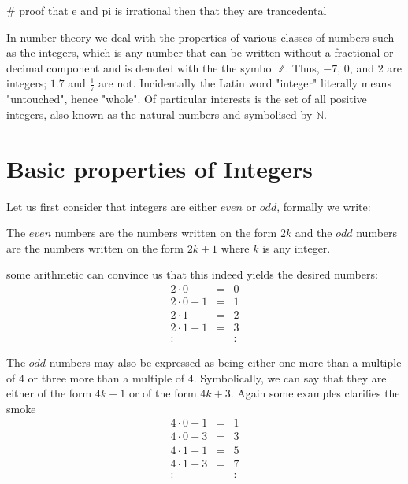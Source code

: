 # proof that e and pi is irrational then that they are trancedental


In number theory we deal with the properties of various classes of numbers such
as the integers, which is any number that can be written without a fractional
or decimal component and is denoted with the the symbol $\mathbb{Z}$. Thus,
$-7$, $0$, and $2$ are integers; $1.7$ and $\frac{1}{7}$ are not. Incidentally
the Latin word "integer" literally means "untouched", hence "whole". Of
particular interests is the set of all positive integers, also known as the
natural numbers and symbolised by $\mathbb{N}$.

\section{Basic properties of Integers}
Let us first consider that integers are either $even$ or $odd$, formally we
write:
\begin{definition}\label{num_def}
The $even$ numbers are the numbers written on the form $2k$ and the $odd$ numbers are the numbers written on the form $2k+1$ where $k$ is any integer.
\end{definition}
some arithmetic can convince us that this indeed yields the desired numbers:
\[
\begin{array}{lcl}
2 \cdot 0     & = & 0 \\
2 \cdot 0 + 1 & = & 1 \\
2 \cdot 1     & = & 2 \\
2 \cdot 1 + 1 & = & 3 \\
:             &   & :
\end{array}
\]

The $odd$ numbers may also be expressed as being either one more than a
multiple of $4$ or three more than a multiple of $4$. Symbolically, we can say
that they are either of the form $4k + 1$ or of the form $4k  + 3$. Again some
examples clarifies the smoke
\[
\begin{array}{lcl}
4 \cdot 0 + 1 & = & 1 \\
4 \cdot 0 + 3 & = & 3 \\
4 \cdot 1 + 1 & = & 5 \\
4 \cdot 1 + 3 & = & 7 \\
:             &   & :
\end{array}
\]

